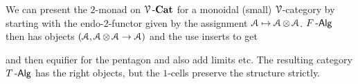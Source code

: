 \documentclass[a4paper,11pt,oneside,openany]{scrbook}
\begin{document}
\begin{exmp}
   We can present the $2$-monad on $\operatorname{\mathcal{V}}\text{-}{\normalfont\textbf{Cat}}$ for a monoidal (small) $\operatorname{\mathcal{V}}$-category by starting with the endo-$2$-functor given by the assignment 
   $\operatorname{\mathcal{A}} \mapsto \operatorname{\mathcal{A}} \otimes \operatorname{\mathcal{A}}$. $F\operatorname{-\mathsf{Alg}}$ then has objects $(\operatorname{\mathcal{A}},\operatorname{\mathcal{A}} \otimes \operatorname{\mathcal{A}} \to \operatorname{\mathcal{A}})$ and the use inserts to get  
      \begin{center}
      \end{center}
   and then equifier for the pentagon and also add limits etc. The resulting category $T\operatorname{-\mathsf{Alg}}$ has the right objects, but the $1$-cells preserve the structure strictly. 
\end{exmp}

		\backmatter
	
	\nocite{*}


\end{document}
